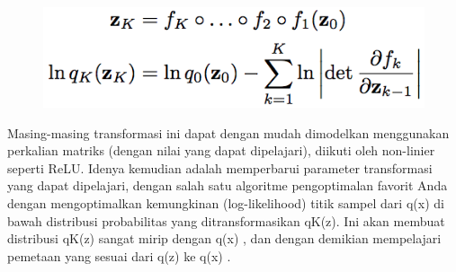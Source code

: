 \begin{figure}[H]
        \centerline{\includegraphics[scale=.5]{figures/rumus10}}
		\label{rumus10}
\end{figure}

Masing-masing transformasi ini dapat dengan mudah dimodelkan menggunakan perkalian matriks (dengan nilai yang dapat dipelajari), diikuti oleh non-linier seperti ReLU. Idenya kemudian adalah memperbarui parameter transformasi yang dapat dipelajari, dengan salah satu algoritme pengoptimalan favorit Anda dengan mengoptimalkan kemungkinan (log-likelihood) titik sampel dari q(x) di bawah distribusi probabilitas yang ditransformasikan qK(z). Ini akan membuat distribusi qK(z) sangat mirip dengan q(x) , dan dengan demikian mempelajari pemetaan yang sesuai dari q(z) ke q(x) .

